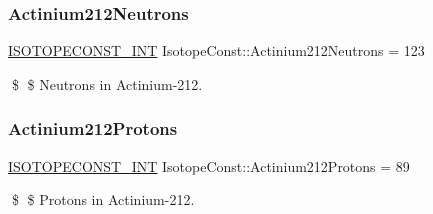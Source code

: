 \subsubsection{\texorpdfstring{Actinium212\+Neutrons}{Actinium212Neutrons}}
{\footnotesize\ttfamily \mbox{\hyperlink{group___isotope_const-_macros_ga5f18360b3e99483a35c32d789e62621c}{I\+S\+O\+T\+O\+P\+E\+C\+O\+N\+S\+T\+\_\+\+I\+NT}} Isotope\+Const\+::\+Actinium212\+Neutrons = 123}

\$ \$ Neutrons in Actinium-\/212. \mbox{\label{group___isotope_const-_actinium-_ac212_gae5fa46b920240180e80dbc37954bcc3e}} 
\subsubsection{\texorpdfstring{Actinium212\+Protons}{Actinium212Protons}}
{\footnotesize\ttfamily \mbox{\hyperlink{group___isotope_const-_macros_ga5f18360b3e99483a35c32d789e62621c}{I\+S\+O\+T\+O\+P\+E\+C\+O\+N\+S\+T\+\_\+\+I\+NT}} Isotope\+Const\+::\+Actinium212\+Protons = 89}

\$ \$ Protons in Actinium-\/212. 